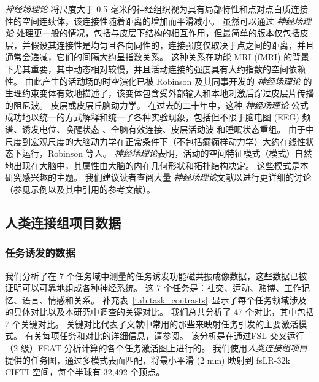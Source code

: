\documentclass[lang=cn,a4paper,newtx,citestyle=gb7714-2015, bibstyle=gb7714-2015]{elegantpaper}
\begin{document}
\textit{神经场理论} 将尺度大于 0.5 毫米的神经组织视为具有局部特性和点对点白质连接性的空间连续体，该连接性随着距离的增加而平滑减小。
虽然可以通过 \textit{神经场理论} 处理更一般的情况，包括与皮层下结构的相互作用\cite{robinson2005multiscale,sanz2018nftsim}，但最简单的版本仅包括皮层，并假设其连接性是均匀且各向同性的，连接强度仅取决于点之间的距离，并且通常会递减，它们的间隔大约呈指数关系\cite{deco2008dynamic,braitenberg2013cortex,henderson2014relations,robinson2019physical}。
这种关系在功能 MRI (fMRI) 的背景下尤其重要，其中动态相对较慢，并且活动连接的强度具有大约指数\cite{braitenberg2013cortex,robinson2019physical,robinson2012interrelating}的空间依赖性。
由此产生的活动场的时空演化已被 Robinson 及其同事开发的 \textit{神经场理论} 的生理约束变体有效地描述了\cite{beurle1956properties,da1976models,jirsa1996field,robinson1997propagation,nunez1974brain}，该变体包含受外部输入和本地刺激后穿过皮层片传播的阻尼波。
皮层或皮层丘脑动力学。
在过去的二十年中，这种 \textit{神经场理论} 公式成功地以统一的方式解释和统一了各种实验现象，包括但不限于脑电图 (EEG) 频谱\cite{robinson2001prediction,pang2018neural}、诱发电位\cite{rennie2002unified,mukta2020evoked}、唤醒状态\cite{abeysuriya2015physiologically,assadzadeh2018necessity} 、全脑有效连接\cite{robinson2012interrelating}、皮层活动波\cite{gabay2018dynamics} 和睡眠状态重组\cite{robinson2005multiscale}。
由于中尺度到宏观尺度的大脑动力学在正常条件下（不包括癫痫样动力学）\cite{robinson2019physical}大约在线性状态下运行，Robinson 等人。
\textit{神经场理论}表明，活动的空间特征模式（模式）自然地出现在大脑中\cite{wang2016brain,roberts2017consistency}，其属性由大脑的内在几何形状和拓扑结构决定\cite{preti2019decoupling,gabay2018dynamics}。
这些模式是本研究感兴趣的主题。
我们建议读者查阅大量 \textit{神经场理论}文献以进行更详细的讨论（参见示例\cite{wright1995simulation,jirsa1996field,robinson1997propagation,robinson2016eigenmodes,gabay2017cortical,wang2016brain,honey2007network,van2013wu,glasser2016multi,naze2021robustness}以及其中引用的参考文献）。



\subsection{人类连接组项目数据} \label{sec:sup_2}

\subsubsection{任务诱发的数据} \label{sec:sup_2_1}

我们分析了在 7 个任务域中测量的任务诱发功能磁共振成像数据，这些数据已被证明可以可靠地组成各种神经系统\cite{barch2013function}。
这 7 个任务是：社交、运动、赌博、工作记忆、语言、情感和关系。
补充表~\ref{tab:task_contrasts}~显示了每个任务领域涉及的具体对比以及本研究中调查的关键对比。
我们总共分析了 47 个对比，其中包括 7 个关键对比。
关键对比代表了文献中常用的那些来映射任务引发的主要激活模式。
有关每项任务和对比的详细信息，请参阅\cite{barch2013function}。
该分析是在通过\href{https://fsl.fmrib.ox.ac.uk/}{FSL} 交叉运行（2 级）FEAT 分析\cite{woolrich2004multilevel}计算的各个任务激活图上进行的。
我们使用\textit{人类连接组项目}提供的任务图，通过多模式表面匹配\cite{robinson2018multimodal}，将最小平滑 (2 mm) 映射到 fsLR-32k CIFTI 空间，每个半球有 32,492 个顶点。
\end{document}
